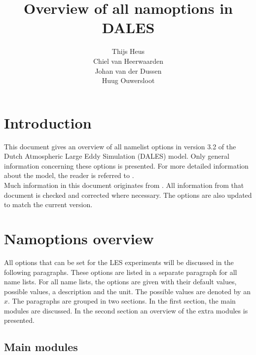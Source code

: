 \documentclass[twoside,11pt,fleqn,a4paper,english,openright]{report}
\begin{document}
 \begin{titlepage}
  \title{\textbf{Overview of all namoptions in DALES}}
  \author{Thijs Heus \\
  Chiel van Heerwaarden \\
  Johan van der Dussen \\
  Huug Ouwersloot}
  \maketitle
 \end{titlepage}
\thispagestyle{empty}

\tableofcontents
{}
\chapter{Introduction}\label{chapter:introduction}

\setcounter{page}{1}
This document gives an overview of all namelist options in version 3.2 of the Dutch Atmospheric Large Eddy Simulation (DALES) model. Only general information concerning these options is presented. For more detailed information about the model, the reader is referred to \citet{Heus2009}. \\
Much information in this document originates from \citet{Heus2009}. All information from that document is checked and corrected where necessary. The options are also updated to match the current version. 

\chapter{Namoptions overview}\label{chapter:namoptions}

All options that can be set for the LES experiments will be discussed in the following paragraphs. These options are listed in a separate paragraph for all name lists. For all name lists, the options are given with their default values, possible values, a description and the unit. The possible values are denoted by an $x$. The paragraphs are grouped in two sections. In the first section, the main modules are discussed. In the second section an overview of the extra modules is presented.

\section{Main modules}\label{par:mainmod}
\end{document}
